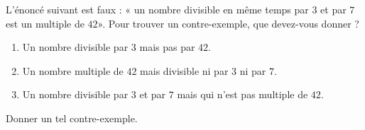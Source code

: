 
\begin{exercice}\label{exosmath-0839}

    L'énoncé suivant est faux : « un nombre divisible en même temps par \( 3\) et par \( 7\) est un multiple de \( 42\)». Pour trouver un contre-exemple, que devez-vous donner ?
    \begin{enumerate}
        \item
            Un nombre divisible par \( 3\) mais pas par \( 42\).
        \item
            Un nombre multiple de \( 42\) mais divisible ni par \( 3\) ni par \( 7\).
        \item
            Un nombre divisible par \( 3\) et par \( 7\) mais qui n'est pas multiple de \( 42\).
    \end{enumerate}
    Donner un tel contre-exemple.

\end{exercice}
